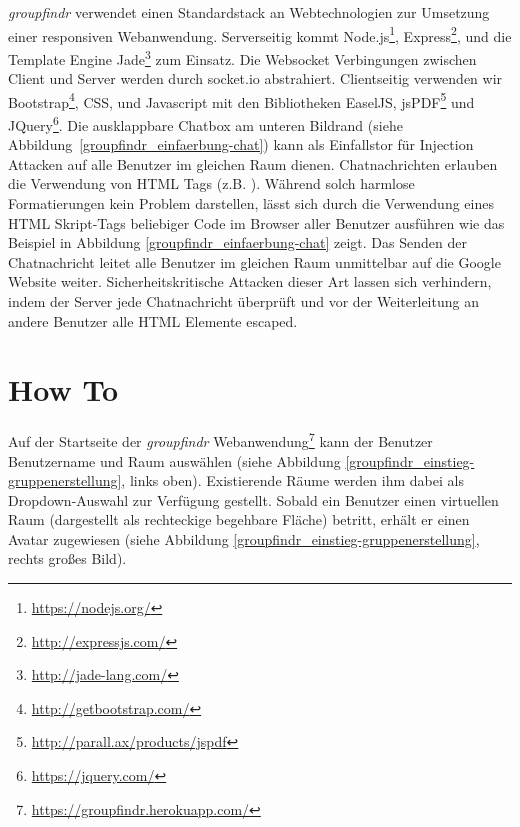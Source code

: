 \emph{groupfindr} verwendet einen Standardstack an Webtechnologien zur Umsetzung einer responsiven Webanwendung. Serverseitig kommt Node.js\footnote{\url{https://nodejs.org/}}, Express\footnote{\url{http://expressjs.com/}}, und die Template Engine Jade\footnote{\url{http://jade-lang.com/}} zum Einsatz. Die Websocket Verbingungen zwischen Client und Server werden durch socket.io abstrahiert. Clientseitig verwenden wir Bootstrap\footnote{\url{http://getbootstrap.com/}}, CSS, und Javascript mit den Bibliotheken EaselJS, jsPDF\footnote{\url{http://parall.ax/products/jspdf}} und JQuery\footnote{\url{https://jquery.com/}}.
\newline\newline
Die ausklappbare Chatbox am unteren Bildrand (siehe Abbildung~\ref{groupfindr_einfaerbung-chat}) kann als Einfallstor für Injection Attacken auf alle Benutzer im gleichen Raum dienen. Chatnachrichten erlauben die Verwendung von HTML Tags (z.B. ). Während solch harmlose Formatierungen kein Problem darstellen, lässt sich durch die Verwendung eines HTML Skript-Tags beliebiger Code im Browser aller Benutzer ausführen wie das Beispiel in Abbildung \ref{groupfindr_einfaerbung-chat} zeigt. 
\newline
Das Senden der Chatnachricht  leitet alle Benutzer im gleichen Raum unmittelbar auf die Google Website weiter. Sicherheitskritische Attacken dieser Art lassen sich verhindern, indem der Server jede Chatnachricht überprüft und vor der Weiterleitung an andere Benutzer alle HTML Elemente escaped.

\section{How To}
\label{how_to}

Auf der Startseite der \emph{groupfindr} Webanwendung\footnote{\url{https://groupfindr.herokuapp.com/}} kann der Benutzer Benutzername und Raum auswählen (siehe Abbildung \ref{groupfindr_einstieg-gruppenerstellung}, links oben). Existierende Räume werden ihm dabei als Dropdown-Auswahl zur Verfügung gestellt. Sobald ein Benutzer einen virtuellen Raum (dargestellt als rechteckige begehbare Fläche) betritt, erhält er einen Avatar zugewiesen (siehe Abbildung \ref{groupfindr_einstieg-gruppenerstellung}, rechts großes Bild).

